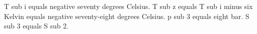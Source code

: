 T sub i equals negative seventy degrees Celsius.
T sub z equals T sub i minus six Kelvin equals negative seventy-eight degrees Celsius.
p sub 3 equals eight bar.
S sub 3 equals S sub 2.